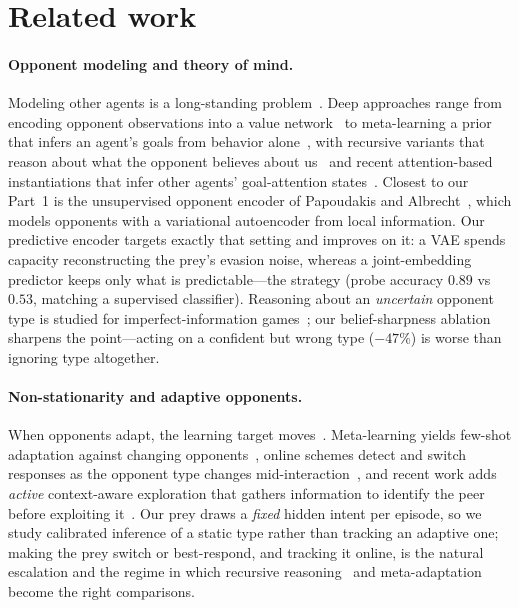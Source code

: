 \documentclass[11pt]{article}
\begin{document}
\section{Related work}

\paragraph{Opponent modeling and theory of mind.}
Modeling other agents is a long-standing problem~\cite{albrecht2018}. Deep
approaches range from encoding opponent observations into a value
network~\cite{he2016} to meta-learning a prior that infers an agent's goals from
behavior alone~\cite{rabinowitz2018}, with recursive variants that reason about
what the opponent believes about us~\cite{wen2019} and recent attention-based
instantiations that infer other agents' goal-attention states~\cite{long2025iaa}.
Closest to our Part~1 is the
unsupervised opponent encoder of Papoudakis and Albrecht~\cite{papoudakis2019vae},
which models opponents with a variational autoencoder from local information.
Our predictive encoder targets exactly that setting and improves on it: a VAE
spends capacity reconstructing the prey's evasion noise, whereas a joint-embedding
predictor keeps only what is predictable---the strategy (probe accuracy $0.89$ vs
$0.53$, matching a supervised classifier). Reasoning about an \emph{uncertain}
opponent type is studied for imperfect-information games~\cite{shen2019}; our
belief-sharpness ablation sharpens the point---acting on a confident but wrong
type ($-47\%$) is worse than ignoring type altogether.

\paragraph{Non-stationarity and adaptive opponents.}
When opponents adapt, the learning target moves~\cite{hernandezleal2017}.
Meta-learning yields few-shot adaptation against changing
opponents~\cite{alshedivat2018}, online schemes detect and switch responses as
the opponent type changes mid-interaction~\cite{everett2018}, and recent work adds
\emph{active} context-aware exploration that gathers information to identify the
peer before exploiting it~\cite{ma2024fpa}. Our prey draws a
\emph{fixed} hidden intent per episode, so we study calibrated inference of a
static type rather than tracking an adaptive one; making the prey switch or
best-respond, and tracking it online, is the natural escalation and the regime in
which recursive reasoning~\cite{wen2019} and meta-adaptation~\cite{alshedivat2018}
become the right comparisons.
\end{document}
